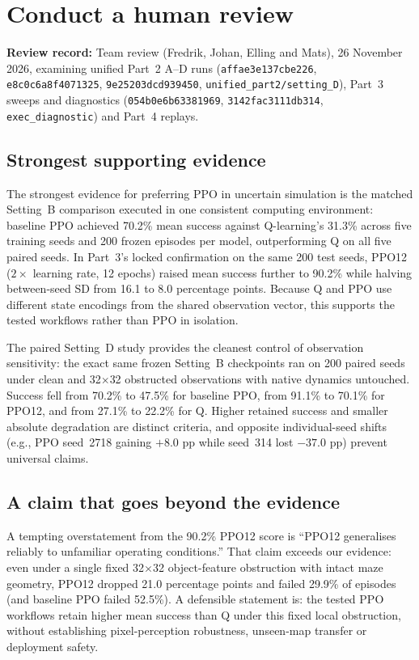 \setcounter{section}{4}
\section{Conduct a human review}
\label{sec:human-review}

\noindent\textbf{Review record:} Team review (Fredrik, Johan, Elling and Mats), 26 November 2026,
examining unified Part~2 A--D runs (\texttt{affae3e137cbe226}, \texttt{e8c0c6a8f4071325},
\texttt{9e25203dcd939450}, \texttt{unified\_part2/setting\_D}), Part~3 sweeps and diagnostics
(\texttt{054b0e6b63381969}, \texttt{3142fac3111db314}, \texttt{exec\_diagnostic}) and Part~4 replays.

\subsection*{Strongest supporting evidence}
The strongest evidence for preferring PPO in uncertain simulation is the matched Setting~B
comparison executed in one consistent computing environment: baseline PPO achieved 70.2\%
mean success against Q-learning's 31.3\% across five training seeds and 200 frozen episodes
per model, outperforming Q on all five paired seeds. In Part~3's locked confirmation on the
same 200 test seeds, PPO12 ($2\times$ learning rate, 12 epochs) raised mean success further
to 90.2\% while halving between-seed SD from 16.1 to 8.0 percentage points. Because Q and PPO
use different state encodings from the shared observation vector, this supports the tested
workflows rather than PPO in isolation.

The paired Setting~D study provides the cleanest control of observation sensitivity: the exact
same frozen Setting~B checkpoints ran on 200 paired seeds under clean and 32$\times$32 obstructed
observations with native dynamics untouched. Success fell from 70.2\% to 47.5\% for baseline PPO,
from 91.1\% to 70.1\% for PPO12, and from 27.1\% to 22.2\% for Q. Higher retained success and
smaller absolute degradation are distinct criteria, and opposite individual-seed shifts (e.g.,
PPO seed~2718 gaining $+8.0$ pp while seed~314 lost $-37.0$ pp) prevent universal claims.

\subsection*{A claim that goes beyond the evidence}
A tempting overstatement from the 90.2\% PPO12 score is ``PPO12 generalises reliably to
unfamiliar operating conditions.'' That claim exceeds our evidence: even under a single
fixed 32$\times$32 object-feature obstruction with intact maze geometry, PPO12 dropped 21.0
percentage points and failed 29.9\% of episodes (and baseline PPO failed 52.5\%). A defensible
statement is: the tested PPO workflows retain higher mean success than Q under this fixed local
obstruction, without establishing pixel-perception robustness, unseen-map transfer or deployment safety.

